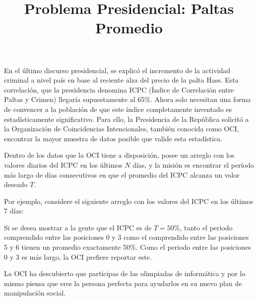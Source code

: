 \documentclass{oci}
\title{Problema Presidencial: Paltas Promedio}
\begin{document}
\begin{problemDescription}
En el último discurso presidencial, se explicó el incremento de la actividad
criminal a nivel país en base al reciente alza del precio de la palta Hass.
Esta correlación, que la presidencia denomina ICPC (Índice de Correlación entre
Paltas y Crimen) llegaría supuestamente al 65\%.
Ahora solo necesitan una forma de convencer a la población de que este índice 
completamente inventado es estadísticamente significativo.
Para ello, la Presidencia de la República solicitó a la Organización de
Coincidencias Intencionales, también conocida como OCI, encontrar la mayor
muestra de datos posible que valide esta estadística.

Dentro de los datos que la OCI tiene a disposición, posee un arreglo con los
valores diarios del ICPC en los últimos $N$ días, y la misión es encontrar el
período más largo de días consecutivos en que el promedio del ICPC alcanza un
valor deseado $T$.

Por ejemplo, considere el siguiente arreglo con los valores del ICPC en los
últimos 7 días:
\begin{center}
\end{center}

Si se desea mostrar a la gente que el ICPC es de $T=50\%$, tanto el periodo
comprendido entre las posiciones 0 y 3 como el comprendido entre las posiciones
5 y 6 tienen un promedio exactamente 50\%.
Como el periodo entre las posiciones 0 y 3 es más largo, la OCI prefiere
reportar este.

La OCI ha descubierto que participas de las olimpiadas de informática y por lo mismo
piensa que eres la persona perfecta para ayudarlos en su nuevo plan de
manipulación social.
\end{problemDescription}
\end{document}
